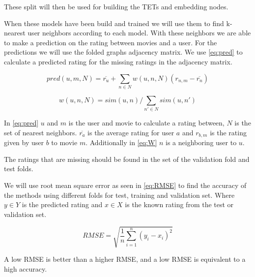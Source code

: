 These split will then be used for building the TETs and embedding nodes.

When these models have been build and trained we will use them to find k-nearest user neighbors according  to each model. With these neighbors we are able to make a prediction on the rating between movies and a user. For the predictions we will use the folded graphs adjacency matrix. We use \autoref{eq:pred} to calculate a predicted rating for the missing ratings in the adjacency matrix.

\begin{equation}\label{eq:pred}
pred(u,m,N) = \overline{r_u}+\sum_{n \in N}w(u,n, N)(r_{n,m}-\overline{r_n})
\end{equation}

\begin{equation}\label{eq:W}
w(u,n, N)=sim(u,n)/\sum_{n' \in N} sim(u,n')
\end{equation}

In \autoref{eq:pred} $u$ and $m$ is the user and movie to calculate a rating between, $N$ is the set of nearest neighbors. $\overline{r_a}$ is the average rating for user $a$ and $r_{b,m}$ is the rating given by user $b$ to movie $m$.
Additionally in \autoref{eq:W} $n$ is a neighboring user to $u$.

The ratings that are missing should be found in the set of the validation fold and test folds.

We will use root mean square error as seen in  \autoref{eq:RMSE}\cite{chai2014root} to find the accuracy of the methods using different folds for test, training and validation set. Where $y \in Y$ is the predicted rating and $x \in X$ is the known rating from the test or validation set.

\begin{equation}\label{eq:RMSE}
RMSE = \sqrt{\frac{1}{n}\sum^n_{i=1}(y_i - x_i)^2}
\end{equation}

A low RMSE is better than a higher RMSE, and a low RMSE is equivalent to a high accuracy.

